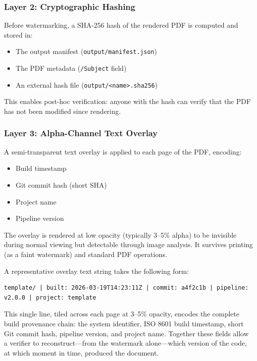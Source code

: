 \documentclass[
]{article}
\providecommand{\tightlist}{%
  \setlength{\itemsep}{0pt}\setlength{\parskip}{0pt}}
\begin{document}
\subsubsection{Layer 2: Cryptographic
Hashing}\label{layer-2-cryptographic-hashing}

Before watermarking, a SHA-256 hash of the rendered PDF is computed and
stored in:

\begin{itemize}
\tightlist
\item
  The output manifest (\texttt{output/manifest.json})
\item
  The PDF metadata (\texttt{/Subject} field)
\item
  An external hash file
  (\texttt{output/\textless{}name\textgreater{}.sha256})
\end{itemize}

This enables post-hoc verification: anyone with the hash can verify that
the PDF has not been modified since rendering.

\subsubsection{Layer 3: Alpha-Channel Text
Overlay}\label{layer-3-alpha-channel-text-overlay}

A semi-transparent text overlay is applied to each page of the PDF,
encoding:

\begin{itemize}
\tightlist
\item
  Build timestamp
\item
  Git commit hash (short SHA)
\item
  Project name
\item
  Pipeline version
\end{itemize}

The overlay is rendered at low opacity (typically 3--5\% alpha) to be
invisible during normal viewing but detectable through image analysis.
It survives printing (as a faint watermark) and standard PDF operations.

A representative overlay text string takes the following form:

\begin{verbatim}
template/ | built: 2026-03-19T14:23:11Z | commit: a4f2c1b | pipeline: v2.0.0 | project: template
\end{verbatim}

This single line, tiled across each page at 3--5\% opacity, encodes the
complete build provenance chain: the system identifier, ISO 8601 build
timestamp, short Git commit hash, pipeline version, and project name.
Together these fields allow a verifier to reconstruct---from the
watermark alone---which version of the code, at which moment in time,
produced the document.
\end{document}
